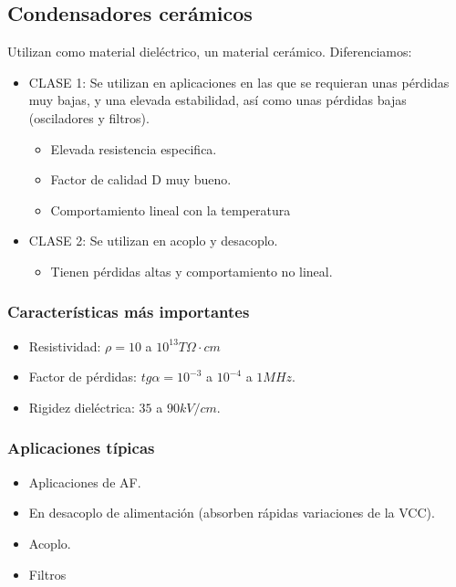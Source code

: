 \subsection{Condensadores cerámicos}

Utilizan como material dieléctrico, un material cerámico. Diferenciamos:

\begin{itemize}
    \item CLASE 1: Se utilizan en aplicaciones en las que se requieran unas pérdidas muy bajas, y una elevada estabilidad, así como unas pérdidas bajas (osciladores y filtros).
    \begin{itemize}
        \item Elevada resistencia especifica.
        \item Factor de calidad D muy bueno.
        \item Comportamiento lineal con la temperatura
    \end{itemize}
    \item CLASE 2: Se utilizan en acoplo y desacoplo.
    \begin{itemize}
        \item Tienen pérdidas altas y comportamiento no lineal.
    \end{itemize}
\end{itemize}

\subsubsection{Características más importantes}
\begin{itemize}
    \item Resistividad: $\rho = 10$ a $10^{13}T\Omega \cdot cm$
    \item Factor de pérdidas: $tg \alpha = 10^{-3}$ a $10^{-4}$ a $1 MHz$.
    \item Rigidez dieléctrica: $35$ a $90 kV/cm$.
\end{itemize}

\subsubsection{Aplicaciones típicas}
\begin{itemize}
    \item Aplicaciones de AF.
    \item En desacoplo de alimentación (absorben rápidas variaciones de la VCC).
    \item Acoplo.
    \item Filtros
\end{itemize}

